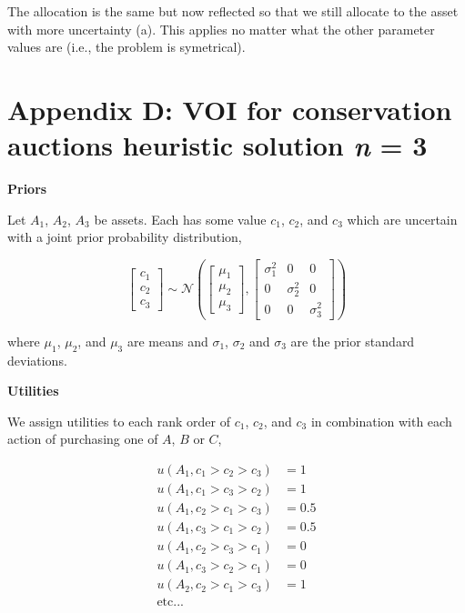 \documentclass[]{article}
\theoremstyle{definition}
\theoremstyle{definition}
\theoremstyle{remark}
\begin{document}
The allocation is the same but now reflected so that we still allocate
to the asset with more uncertainty (a). This applies no matter what the
other parameter values are (i.e., the problem is symetrical).

\captionsetup{labelformat=default}

\newpage

\captionsetup{labelformat=empty}

\section*{\texorpdfstring{Appendix D: VOI for conservation auctions
heuristic solution \emph{n} =
3}{Appendix D: VOI for conservation auctions heuristic solution n = 3}}\label{appendix-d-voi-for-conservation-auctions-heuristic-solution-n-3}

\textbf{Priors}

Let \(A_1\), \(A_2\), \(A_3\) be assets. Each has some value \(c_1\),
\(c_2\), and \(c_3\) which are uncertain with a joint prior probability
distribution,

\begin{equation}
\begin{bmatrix}c_1 \\ c_2 \\ c_3\end{bmatrix}\sim\mathcal{N}\left(\begin{bmatrix}\mu_1 \\ \mu_2 \\ \mu_3\end{bmatrix}, \begin{bmatrix}\sigma^2_1 & 0 & 0 \\ 0 & \sigma^2_2 & 0\\ 0 & 0 & \sigma^2_3 \end{bmatrix}\right)
\label{eq:jointprior}
\end{equation}

where \(\mu_1\), \(\mu_2\), and \(\mu_3\) are means and \(\sigma_1\),
\(\sigma_2\) and \(\sigma_3\) are the prior standard deviations.

\textbf{Utilities}

We assign utilities to each rank order of \(c_1\), \(c_2\), and \(c_3\)
in combination with each action of purchasing one of \(A\), \(B\) or
\(C\),

\begin{equation}
\begin{aligned}
u(A_1, c_1 > c_2 > c_3)&=1\\
u(A_1, c_1 > c_3 > c_2)&=1\\
u(A_1, c_2 > c_1 > c_3)&=0.5\\
u(A_1, c_3 > c_1 > c_2)&=0.5\\
u(A_1, c_2 > c_3 > c_1)&=0\\
u(A_1, c_3 > c_2 > c_1)&=0\\
u(A_2, c_2 > c_1 > c_3)&=1\\
\mathrm{etc...}&
\end{aligned}
\label{eq:utilitiesapen2}
\end{equation}
\end{document}
